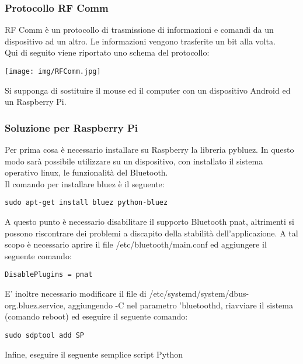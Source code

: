 \documentclass{article}
\begin{document}
\subsubsection{Protocollo RF Comm}
RF Comm è un protocollo di trasmissione di informazioni e comandi da un dispositivo ad un altro. Le informazioni vengono trasferite un bit alla volta. \\
Qui di seguito viene riportato uno schema del protocollo:
\begin{center}
\texttt{[image: img/RFComm.jpg]}
\end{center}
Si supponga di sostituire il mouse ed il computer con un dispositivo Android ed un Raspberry Pi.
\subsubsection{Soluzione per Raspberry Pi}
Per prima cosa è necessario installare su Raspberry la libreria pybluez. In questo modo sarà possibile utilizzare su un dispositivo, con installato il sistema operativo linux, le funzionalità del Bluetooth. \\
Il comando per installare bluez è il seguente:
\begin{lstlisting}
sudo apt-get install bluez python-bluez
\end{lstlisting}
A questo punto è necessario disabilitare il supporto Bluetooth pnat, altrimenti si possono riscontrare dei problemi a discapito della stabilità dell'applicazione. A tal scopo è necessario aprire il file /etc/bluetooth/main.conf ed aggiungere il seguente comando:
\begin{lstlisting}
DisablePlugins = pnat
\end{lstlisting}
E' inoltre necessario modificare il file di /etc/systemd/system/dbus-org.bluez.service, aggiungendo -C nel parametro 'bluetoothd, riavviare il sistema (comando reboot) ed eseguire il seguente comando:
\begin{lstlisting}
sudo sdptool add SP
\end{lstlisting}
Infine, eseguire il seguente semplice script Python
\end{document}
